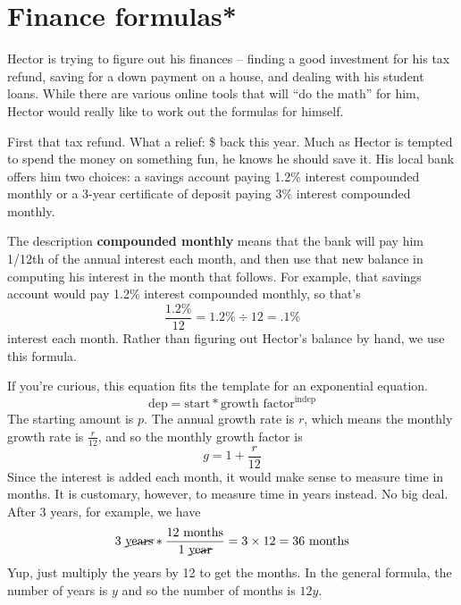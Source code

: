 
\section{Finance formulas*}

Hector is trying to figure out his finances -- finding a good investment for his tax refund, saving for a down payment on a house, and dealing with his student loans.  While there are various online tools that will ``do the math'' for him, Hector would really like to work out the formulas for himself.

First that tax refund.  What a relief:  \$ back this year.  Much as Hector is tempted to spend the money on something fun, he knows he should save it.  His local bank offers him two choices:  a savings account paying 1.2\% interest compounded monthly or a 3-year certificate of deposit paying 3\% interest compounded monthly.  

The description \textbf{compounded monthly} means that the bank will pay him 1/12th of the annual interest each month, and then use that new balance in computing his interest in the month that follows.  For example, that savings account would pay 1.2\% interest compounded monthly, so  that's $$\frac{1.2\%}{12}= 1.2\% \div 12 = .1\%$$ interest each month.  Rather than figuring out Hector's balance by hand, we use this formula.

 \bigskip
\bigskip

If you're curious, this equation fits the template for an exponential equation.  
$$\text{dep} = \text{start} \ast \text{growth factor} ^ {\text{indep}}$$
The starting amount is $p$.  The annual growth rate is $r$, which means the monthly growth rate is $\frac{r}{12}$, and so the monthly growth factor is 
$$g=1+\frac{r}{12}$$ 
Since the interest is added each month, it would make sense to measure time in months.  It is customary, however, to measure time in years instead.  No big deal.  After 3 years, for example, we have 
$$3 \text{ \cancel{years}} \ast \frac{12 \text{ months}}{1\text{ \cancel{year}}} = 3 \times 12 = 36 \text{ months}$$  
Yup, just multiply the years by 12 to get the months.  In the general formula, the number of years is $y$ and so the number of months is $12y$.

